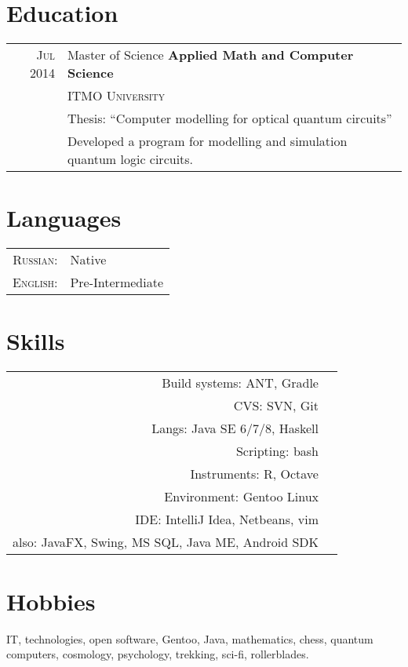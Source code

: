 \documentclass[a4paper,10pt]{article}
\begin{document}
\section{Education}
	\begin{tabular}{rl}	
	  \textsc{Jul 2014} & Master of Science \textbf{ Applied Math and Computer Science} \\& \textsc{ITMO University}\\
			& Thesis: ``Computer modelling for optical quantum circuits''\\&
			Developed a program for modelling and simulation quantum logic circuits.
	\end{tabular}

\section{Languages}
	\begin{tabular}{rl}
		\textsc{Russian:}&Native\\
		\textsc{English:}&Pre-Intermediate\\
	\end{tabular}

\section{Skills}
	\begin{tabular}{rl}
		Build systems: ANT, Gradle \\
		CVS: SVN, Git \\
		Langs: Java SE 6/7/8, Haskell \\
		Scripting: bash \\ 
		Instruments: R, Octave \\
		Environment: Gentoo Linux \\
		IDE: IntelliJ Idea, Netbeans, vim \\
		also: JavaFX, Swing, MS SQL, Java ME, Android SDK
	\end{tabular}

\section{Hobbies}
	IT, technologies, open software, Gentoo, Java, mathematics, chess, quantum computers, cosmology,
	psychology, trekking, sci-fi, rollerblades. 
\end{document}
